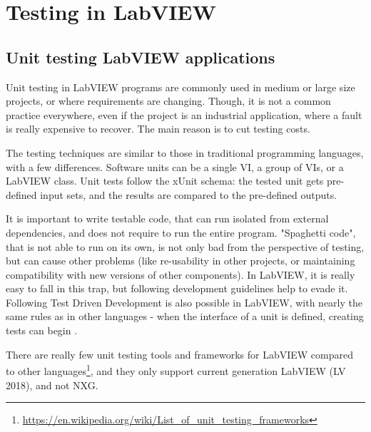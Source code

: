 \chapter{Testing in LabVIEW}

\section{Unit testing LabVIEW applications}
Unit testing in LabVIEW programs are commonly used in medium or large size projects, or where requirements are changing. Though, it is not a common practice everywhere, even if the project is an industrial application, where a fault is really expensive to recover. The main reason is to cut testing costs.

The testing techniques are similar to those in traditional programming languages, with a few differences. Software units can be a single VI, a group of VIs, or a LabVIEW class. Unit tests follow the xUnit schema: the tested unit gets pre-defined input sets, and the results are compared to the pre-defined outputs.

It is important to write testable code, that can run isolated from external dependencies, and does not require to run the entire program. "Spaghetti code", that is not able to run on its own, is not only bad from the perspective of testing, but can cause other problems (like re-usability in other projects, or maintaining compatibility with new versions of other components). In LabVIEW, it is really easy to fall in this trap, but following development guidelines help to evade it. Following Test Driven Development is also possible in LabVIEW, with nearly the same rules as in other languages - when the interface of a unit is defined, creating tests can begin \cite{delacor_ni2014}. 

There are really few unit testing tools and frameworks for LabVIEW compared to other languages\footnote{\url{https://en.wikipedia.org/wiki/List_of_unit_testing_frameworks}}, and they only support current generation LabVIEW (LV 2018), and not NXG.
